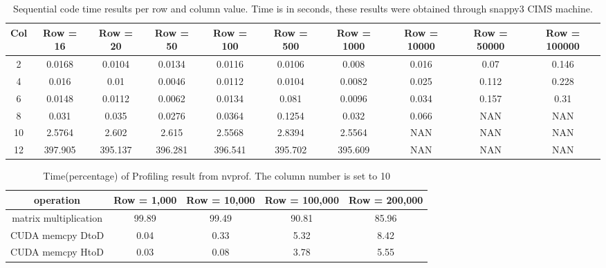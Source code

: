 \documentclass[letterpaper, 10 pt, conference]{ieeeconf}  %
\begin{document}

\begin{table}[h]
\centering
\caption{Sequential code time results per row and column value. Time is in seconds, these results were obtained through snappy3 CIMS machine.}
\label{seq_ex}
\begin{center}
\begin{tabular}{|c|c|c|c|c|c|c|c|c|c|}
\hline
Col & Row = 16 & Row = 20 & Row = 50 & Row = 100 & Row = 500 & Row = 1000 & Row = 10000 & Row = 50000 & Row = 100000\\
\hline
2 & 0.0168 & 0.0104 & 0.0134 & 0.0116 & 0.0106 & 0.008 & 0.016 & 0.07 & 0.146 \\
\hline
4 & 0.016 & 0.01 & 0.0046 & 0.0112 & 0.0104 & 0.0082 & 0.025 & 0.112 & 0.228 \\
\hline
6 & 0.0148 & 0.0112 & 0.0062 & 0.0134 & 0.081 & 0.0096 & 0.034 & 0.157 & 0.31 \\
\hline
8 & 0.031 & 0.035 & 0.0276 & 0.0364 & 0.1254 & 0.032 & 0.066 & NAN & NAN \\
\hline
10 & 2.5764 & 2.602 & 2.615 & 2.5568 & 2.8394 & 2.5564 & NAN & NAN & NAN \\
\hline
12 & 397.905 & 395.137 & 396.281 & 396.541 & 395.702 & 395.609 & NAN & NAN & NAN \\
\hline
\end{tabular}
\end{center}
\end{table}

\begin{table}[h]
\centering
\caption{Time(percentage) of Profiling result from nvprof. The column number is set to 10}
\label{seq_ex}
\begin{center}
\begin{tabular}{|c|c|c|c|c|}
\hline
operation & Row = 1,000 & Row = 10,000 & Row = 100,000 & Row = 200,000 \\
\hline
matrix multiplication & 99.89 & 99.49 & 90.81 & 85.96 \\
\hline
CUDA memcpy DtoD & 0.04 & 0.33 & 5.32 & 8.42 \\
\hline
CUDA memcpy HtoD & 0.03 & 0.08 & 3.78 & 5.55 \\
\hline
\end{tabular}
\end{center}
\end{table}
\end{document}
